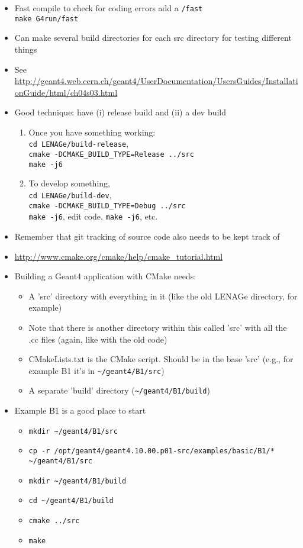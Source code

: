 \documentclass[11pt]{article}
\begin{document}
\begin{itemize}
\item Fast compile to check for coding errors add a \verb~/fast~ \\
    \verb~make G4run/fast~
\item Can make several build directories for each src directory for
testing different things
\item See
    \url{http://geant4.web.cern.ch/geant4/UserDocumentation/UsersGuides/InstallationGuide/html/ch04s03.html}
\item Good technique: have (i) release build and (ii) a dev build
\begin{enumerate}
\item Once you have something working:\\
       \verb~cd LENAGe/build-release~,\\
       \verb~cmake -DCMAKE_BUILD_TYPE=Release ../src~\\
       \verb~make -j6~
\item To develop something,\\
       \verb~cd LENAGe/build-dev~,\\
       \verb~cmake -DCMAKE_BUILD_TYPE=Debug ../src~\\
       \verb~make -j6~, edit code, \verb~make -j6~, etc.
\end{enumerate}
\item Remember that git tracking of source code also needs to be kept
track of
\item \url{http://www.cmake.org/cmake/help/cmake_tutorial.html}
\item Building a Geant4 application with CMake needs:
\begin{itemize}
\item A 'src' directory with everything in it (like the old LENAGe
directory, for example)
\item Note that there is another directory within this called 'src'
with all the .cc files (again, like with the old code)
\item CMakeLists.txt is the CMake script. Should be in the base 'src'
(e.g., for example B1 it's in \verb,~/geant4/B1/src,)
\item A separate 'build' directory (\verb,~/geant4/B1/build,)
\end{itemize}
\item Example B1 is a good place to start
\begin{itemize}
\item \verb,mkdir ~/geant4/B1/src,
\item \verb,cp -r /opt/geant4/geant4.10.00.p01-src/examples/basic/B1/* ~/geant4/B1/src,
\item \verb,mkdir ~/geant4/B1/build,
\item \verb,cd ~/geant4/B1/build,
\item \verb~cmake ../src~
\item \verb~make~
\end{itemize}
\end{itemize}
\end{document}
